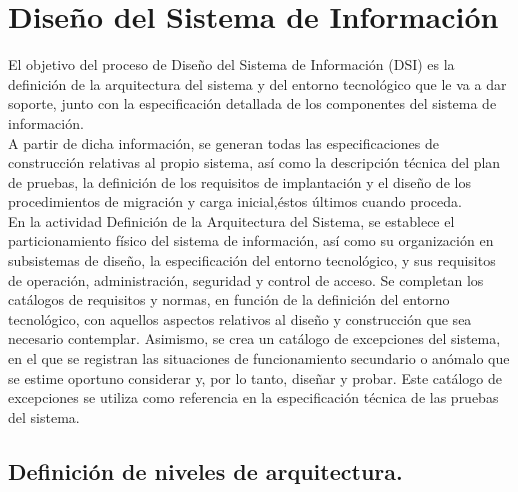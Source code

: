 \rhead{\newtitle}
\cfoot{\thepage}
\renewcommand{\headrulewidth}{1pt}
\renewcommand{\footrulewidth}{1pt}

\chapter{Diseño del Sistema de Información}\label{ch_4}
\noindent El objetivo del proceso de Diseño del Sistema de Información (DSI) es la definición de la arquitectura del sistema y del entorno tecnológico que le va a dar soporte, junto con la especificación detallada de los componentes del sistema de información.\\

\noindent A partir de dicha información, se generan todas las especificaciones de construcción relativas al propio sistema, así como la descripción técnica del plan de pruebas, la definición de los requisitos de implantación y el diseño de los procedimientos de migración y carga inicial,éstos últimos cuando proceda.\\

\noindent En la actividad Definición de la Arquitectura del Sistema, se establece el particionamiento físico del sistema de información, así como su organización en subsistemas de diseño, la especificación del entorno tecnológico, y sus requisitos de operación, administración, seguridad y control de acceso. Se completan los catálogos de requisitos y normas, en función de la definición del entorno tecnológico, con aquellos aspectos relativos al diseño y construcción que sea necesario contemplar. Asimismo, se crea un catálogo de excepciones del sistema, en el que se registran las situaciones de funcionamiento secundario o anómalo que se estime oportuno considerar y, por lo tanto, diseñar y probar. Este catálogo de excepciones se utiliza como referencia en la especificación técnica de las pruebas del sistema.
\section{Definición de niveles de arquitectura.}

